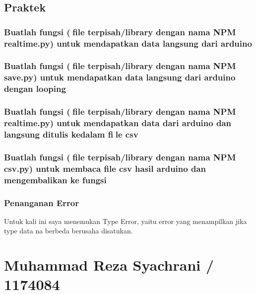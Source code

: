 \subsection{Praktek}
\subsubsection{Buatlah fungsi (file terpisah/library dengan nama NPM realtime.py) untuk mendapatkan data langsung dari arduino}


\subsubsection{Buatlah fungsi (file terpisah/library dengan nama NPM save.py) untuk mendapatkan data langsung dari arduino dengan looping}


\subsubsection{Buatlah fungsi (file terpisah/library dengan nama NPM realtime.py) untuk mendapatkan data dari arduino dan langsung ditulis kedalam file csv}


\subsubsection{Buatlah fungsi (file terpisah/library dengan nama NPM csv.py) untuk membaca file csv hasil arduino dan mengembalikan ke fungsi}


\subsubsection{Penanganan Error}
Untuk kali ini saya menemukan Type Error, yaitu error yang menampilkan jika type data na berbeda berusaha disatukan.



\section{Muhammad Reza Syachrani / 1174084}
